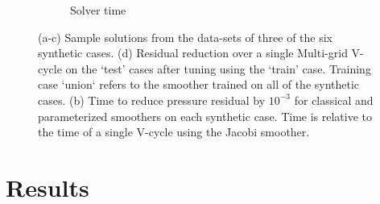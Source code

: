 \documentclass[review]{elsarticle}
\begin{document}
\begin{figure}
\begin{subfigure}[b]{0.47\textwidth}
        \caption{Solver time}
        \label{fig:synthetic time}
    \end{subfigure}
    \caption{(a-c) Sample solutions from the data-sets of three of the six synthetic cases. (d) Residual reduction over a single Multi-grid V-cycle on the `test' cases after tuning using the `train' case. Training case `union` refers to the smoother trained on all of the synthetic cases. (b) Time to reduce pressure residual by $10^{-3}$ for classical and parameterized smoothers on each synthetic case. Time is relative to the time of a single V-cycle using the Jacobi smoother.}
    \label{fig:synthetic cases}
\end{figure}

\section{Results}
\end{document}

